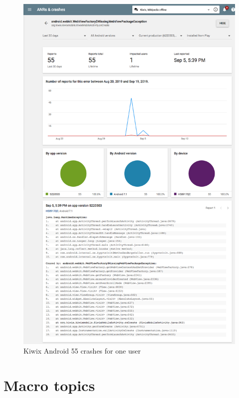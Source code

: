 \begin{figure}
    \centering
    \includegraphics[width=\linewidth]{images/android-vitals-screenshots/55-crashes-WebViewFactory-MissingWebViewPackageException_2019-09-19-kiwix_trimmed.png}
    \caption{Kiwix Android 55 crashes for one user}
    \label{fig:55-crashes-WebViewFactory-MissingWebViewPackageException}
\end{figure}

\FloatBarrier

\section{Macro topics}~\label{aata-macro-topics}

